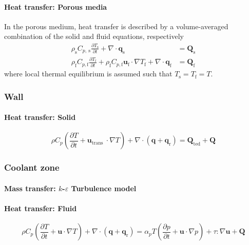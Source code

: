 \paragraph{Heat transfer: Porous media}

In the porous medium, heat transfer is described by a volume-averaged combination of the solid and fluid equations, respectively \cite{comsol_heat_2020}
\begin{align}
    \rho_{\mathrm{s}} C_{p, \mathrm{~s}} \frac{\partial T_{\mathrm{s}}}{\partial t}+\nabla \cdot \mathbf{q}_{\mathrm{s}} &= \mathbf{Q}_{\mathrm{s}} \\
    \rho_{\mathrm{f}} C_{p, \mathrm{f}} \frac{\partial T_{\mathrm{f}}}{\partial t}+\rho_{\mathrm{f}} C_{p, \mathrm{f}} \mathbf{u}_{\mathrm{f}} \cdot \nabla T_{\mathrm{f}}+\nabla \cdot \mathbf{q}_{\mathrm{f}} &= \mathbf{Q}_{\mathrm{f}}
\end{align}
where local thermal equilibrium is assumed such that $T_{\mathrm{s}} = T_{\mathrm{f}} = T$.

\subsubsection{Wall}

\paragraph{Heat transfer: Solid}
\cite{comsol_heat_2020}
\begin{equation}
    \rho C_{p}\left(\frac{\partial T}{\partial t}+\mathbf{u}_{\text {trans }} \cdot \nabla T\right)+\nabla \cdot\left(\mathbf{q}+\mathbf{q}_{\mathrm{r}}\right)= \mathbf{Q}_{\mathrm{ted}}+ \mathbf{Q}
\end{equation}

\subsubsection{Coolant zone}

\paragraph{Mass transfer: $k$-$\varepsilon$ Turbulence model}
\cite{comsol_cfd_2020}

\paragraph{Heat transfer: Fluid}
\cite{comsol_heat_2020}
\begin{equation}
    \rho C_{p}\left(\frac{\partial T}{\partial t}+\mathbf{u} \cdot \nabla T\right)+\nabla \cdot\left(\mathbf{q}+\mathbf{q}_{\mathrm{r}}\right)=\alpha_{p} T\left(\frac{\partial p}{\partial t}+\mathbf{u} \cdot \nabla p\right)+\tau: \nabla \mathbf{u}+\mathbf{Q}
\end{equation}

